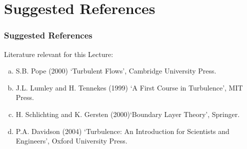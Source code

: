 \documentclass[10pt,compress]{beamer}
\begin{document}
\section{Suggested References}


\begin{frame}
 \frametitle{Suggested References}
  Literature relevant for this Lecture:
  \begin{enumerate}[(a)]%
   \item S.B. Pope (2000) `Turbulent Flows', Cambridge University Press.
   \item J.L. Lumley and H. Tennekes (1999) `A First Course in Turbulence', MIT Press.
   \item H. Schlichting and K. Gersten (2000)`Boundary Layer Theory', Springer.
   \item P.A. Davidson (2004) `Turbulence: An Introduction for Scientists and Engineers', Oxford University Press.
  \end{enumerate}
\end{frame}
\end{document}
